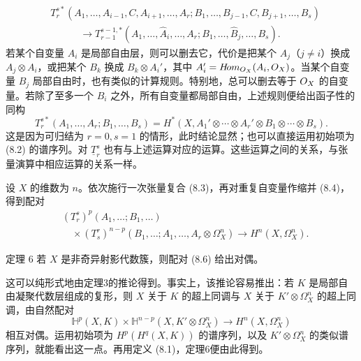 \begin{equation}
\begin{aligned}
&T_r^{s*}(A_1,\ldots,A_{i-1},C,A_{i+1},\ldots,A_r;
B_1,\ldots,B_{j-1},C,B_{j+1},\ldots,B_s)\\
&\hspace{3em}\longrightarrow
T_{r-1}^{s-1,*}(A_1,\ldots,\widehat A_i,\ldots,A_r;
B_1,\ldots,\widehat B_j,\ldots,B_s).
\end{aligned}\tag{8.4}
\end{equation}
若某个自变量 $A_i$ 是局部自由层，则可以删去它，代价是把某个 $A_j$（$j\ne i$）换成 $A_j\otimes A_i$，或把某个 $B_k$ 换成 $B_k\otimes A_i'$，其中 $A_i'=H\!om_{O_X}(A_i,O_X)$。当某个自变量 $B_j$ 局部自由时，也有类似的计算规则。特别地，总可以删去等于 $O_X$ 的自变量。若除了至多一个 $B_i$ 之外，所有自变量都局部自由，上述规则便给出函子性的同构
\begin{equation}
T_r^{s*}(A_1,\ldots,A_r;B_1,\ldots,B_s)
=H^*(X,A_1'\otimes\cdots\otimes A_r'\otimes B_1\otimes\cdots\otimes B_s).
\tag{8.5}
\end{equation}
这是因为可归结为 $r=0,s=1$ 的情形，此时结论显然；也可以直接运用初始项为 (8.2) 的谱序列。对 $\underline T_r^s$ 也有与上述运算对应的运算。这些运算之间的关系，与张量演算中相应运算的关系一样。

设 $X$ 的维数为 $n$。依次施行一次张量复合 (8.3)，再对重复自变量作缩并 (8.4)，得到配对
\begin{equation}
\begin{aligned}
&(T_r^s)^p(A_1,\ldots;B_1,\ldots)\\
&\quad\times(T_s^r)^{n-p}(B_1,\ldots;A_1,\ldots,A_r\otimes\Omega_X^n)
\longrightarrow H^n(X,\Omega_X^n).
\end{aligned}\tag{8.6}
\end{equation}
\begin{statement}{定理 6}
若 $X$ 是非奇异射影代数簇，则配对 (8.6) 给出对偶。
\end{statement}
这可以纯形式地由定理3的推论得到。事实上，该推论容易推出：若 $K$ 是局部自由凝聚代数层组成的复形，则 $X$ 关于 $K$ 的超上同调与 $X$ 关于 $K'\otimes\Omega_X^n$ 的超上同调，由自然配对
\begin{equation}
\mathbb H^p(X,K)\times\mathbb H^{n-p}(X,K'\otimes\Omega_X^n)
\longrightarrow H^n(X,\Omega_X^n)
\tag{8.7}
\end{equation}
相互对偶。运用初始项为 $H^p(H^q(X,K))$ 的谱序列，以及 $K'\otimes\Omega_X^n$ 的类似谱序列，就能看出这一点。再用定义 (8.1)，定理6便由此得到。

